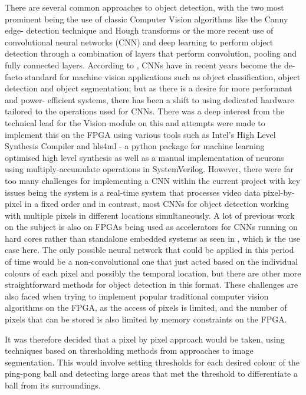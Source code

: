 \documentclass[a4paper]{article}
\begin{document}
There are several common approaches to object detection, with the two most 
prominent being the use of classic Computer Vision algorithms like the Canny edge-
detection technique and Hough transforms or the more recent use of convolutional
neural networks (CNN) and deep learning to perform object detection through a 
combination of layers that perform convolution, pooling and fully connected layers. 
According to \cite{DBLP:journals/corr/abs-1806-01683}, CNNs have in recent years 
become the de-facto standard for machine vision applications such as object 
classification, object detection and object segmentation; but as there is a desire 
for more performant and power- efficient systems, there has been a shift to 
using dedicated hardware tailored to the operations used for CNNs. There was a 
deep interest from the technical lead for the Vision module on this and attempts
were made to implement this on the FPGA using various tools such as Intel's High 
Level Synthesis Compiler \cite{IntelHLS} and hls4ml - a python package for machine learning 
optimised high level synthesis \cite{HLS4ML} as well as a manual implementation of neurons using
multiply-accumulate operations in SystemVerilog. 
However, there were far too many challenges for implementing a CNN within the 
current project with key issues being the system is a real-time system that 
processes video data pixel-by-pixel in a fixed order and in contrast, most CNNs for object 
detection working with multiple pixels in different locations simultaneously. 
A lot of previous work on the subject is also on FPGAs being used as accelerators for 
CNNs running on hard cores rather than standalone embedded systems as seen in \cite{DBLP:journals/corr/abs-1806-01683}
, which is the use case here. The only possible neural network that could be applied in this period of time
would be a non-convolutional one that just acted based on the individual colours of each pixel
and possibly the temporal location, but there are other more straightforward methods for object
detection in this format. 
These challenges are also faced when trying to implement popular traditional computer vision 
algorithms on the FPGA, as the access of pixels is limited, and the number of pixels that can be
stored is also limited by memory constraints on the FPGA. 

It was therefore decided that a pixel by pixel approach would be taken, using techniques
based on thresholding methods from approaches to image segmentation. This would
involve setting thresholds for each desired colour of the ping-pong ball and detecting large 
areas that met the threshold to differentiate a ball from its surroundings. 
\end{document}
